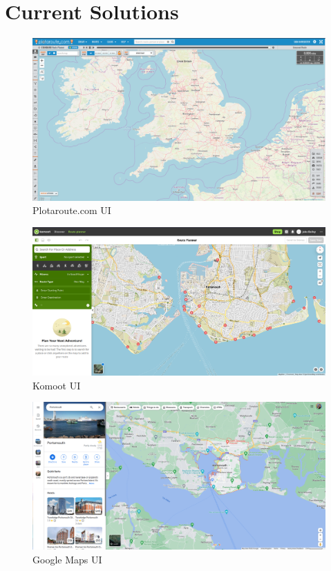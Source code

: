 \chapter{Current Solutions}
\begin{figure}[!ht]
    \centering
    \includegraphics[width=1\linewidth]{figures/plotarouteui.png}
    \caption{Plotaroute.com UI}
    \label{fig:plotarouteui}
\end{figure}

\begin{figure}[!ht]
    \centering
    \includegraphics[width=1\linewidth]{figures/komootui.png}
    \caption{Komoot UI}
    \label{fig:komootui}
\end{figure}

\begin{figure}[!ht]
    \centering
    \includegraphics[width=1\linewidth]{figures/gmapsui.png}
    \caption{Google Maps UI}
    \label{fig:gmapsui}
\end{figure}

